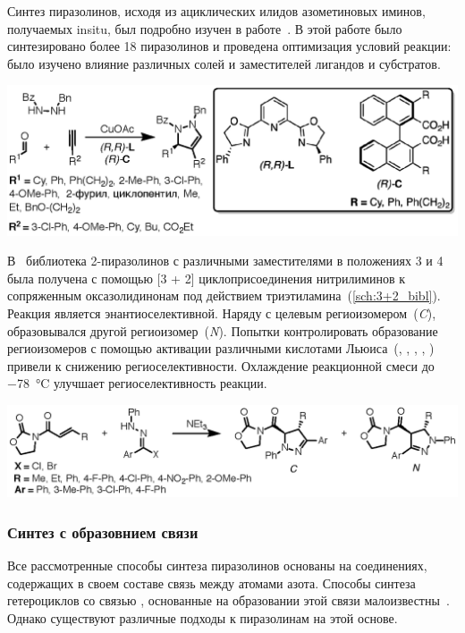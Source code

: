 Синтез пиразолинов, исходя из ациклических илидов азометиновых иминов, получаемых \ac{insitu}, был подробно изучен в работе~\cite{Hashimoto2013}.
В этой работе было синтезировано более \num{18} пиразолинов и проведена оптимизация условий реакции: было изучено влияние различных солей  и заместителей лигандов и субстратов.

\begin{scheme}[h!]
    \centering
    \includegraphics{sections/literature/img/cycloaddition_example.eps}
    \caption{}
    \label{sch:cycloaddition_example}
\end{scheme}

В~\cite{Manyem2007} библиотека 2-пиразолинов с различными заместителями в положениях 3 и 4 была получена с помощью [3 + 2] циклоприсоединения нитрилиминов к сопряженным оксазолидинонам под действием триэтиламина~(\ref{sch:3+2_bibl}).
Реакция является энантиоселективной. Наряду с целевым региоизомером~(\emph{C}), образовывался другой региоизомер~(\emph{N}).
Попытки контролировать образование региоизомеров с помощью активации различными кислотами Льюиса~(, , , , ) привели к снижению региоселективности.
Охлаждение реакционной смеси до \SI{-78}{\celsius} улучшает региоселективность реакции.

\begin{scheme}[h!]
    \centering
    \includegraphics{sections/literature/img/3+2_bibl.eps}
    \caption{}
    \label{sch:3+2_bibl}
\end{scheme}
\FloatBarrier{}

\subsubsection{Синтез с образовнием связи }
Все рассмотренные способы синтеза пиразолинов основаны на соединениях, содержащих в своем составе связь между атомами азота.
Способы синтеза гетероциклов со связью , основанные на образовании этой связи малоизвестны~\cite{Guo2017}.
Однако существуют различные подходы к пиразолинам на этой основе.

